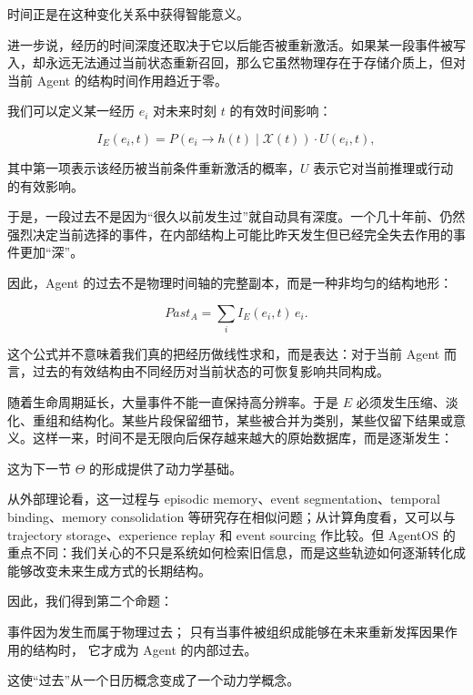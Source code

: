 时间正是在这种变化关系中获得智能意义。

进一步说，经历的时间深度还取决于它以后能否被重新激活。如果某一段事件被写入，却永远无法通过当前状态重新召回，那么它虽然物理存在于存储介质上，但对当前 Agent 的结构时间作用趋近于零。

我们可以定义某一经历 $e_i$ 对未来时刻 $t$ 的有效时间影响：

\[
I_E(e_i,t)
=
P\left(
e_i
\rightarrow
h(t)
\mid
\mathcal{X}(t)
\right)
\cdot
U(e_i,t),
\]

其中第一项表示该经历被当前条件重新激活的概率，$U$ 表示它对当前推理或行动的有效影响。

于是，一段过去不是因为“很久以前发生过”就自动具有深度。一个几十年前、仍然强烈决定当前选择的事件，在内部结构上可能比昨天发生但已经完全失去作用的事件更加“深”。

因此，Agent 的过去不是物理时间轴的完整副本，而是一种非均匀的结构地形：

\[
\boxed{
Past_A
=
\sum_i
I_E(e_i,t)\,e_i.
}
\]

这个公式并不意味着我们真的把经历做线性求和，而是表达：对于当前 Agent 而言，过去的有效结构由不同经历对当前状态的可恢复影响共同构成。

随着生命周期延长，大量事件不能一直保持高分辨率。于是 $E$ 必须发生压缩、淡化、重组和结构化。某些片段保留细节，某些被合并为类别，某些仅留下结果或意义。这样一来，时间不是无限向后保存越来越大的原始数据库，而是逐渐发生：

\begin{statementbox}
\centering
{}
\end{statementbox}

这为下一节 $\Theta$ 的形成提供了动力学基础。

从外部理论看，这一过程与 episodic memory、event segmentation、temporal binding、memory consolidation 等研究存在相似问题；从计算角度看，又可以与 trajectory storage、experience replay 和 event sourcing 作比较。但 AgentOS 的重点不同：我们关心的不只是系统如何检索旧信息，而是这些轨迹如何逐渐转化成能够改变未来生成方式的长期结构。

因此，我们得到第二个命题：

\begin{proposition*}
事件因为发生而属于物理过去；
只有当事件被组织成能够在未来重新发挥因果作用的结构时，
它才成为 Agent 的内部过去。
\end{proposition*}

这使“过去”从一个日历概念变成了一个动力学概念。

